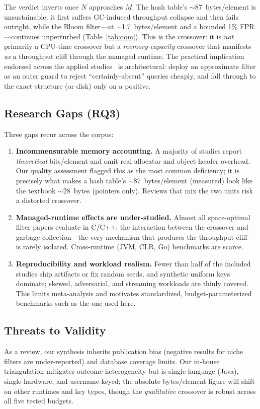 \documentclass[conference]{IEEEtran}
\begin{document}
The verdict inverts once $N$ approaches $M$. The hash table's
$\sim$87~bytes/element is unsustainable; it first suffers GC-induced throughput
collapse and then fails outright, while the Bloom filter---at
$\sim$1.7~bytes/element and a bounded 1\% FPR---continues unperturbed
(Table~\ref{tab:oom}). This is the crossover: it is \emph{not} primarily a
CPU-time crossover but a \emph{memory-capacity} crossover that manifests
\emph{as} a throughput cliff through the managed runtime. The practical
implication endorsed across the applied studies~\cite{chang2008bigtable,
tarkoma2012bloom} is architectural: deploy an approximate filter as an outer
guard to reject ``certainly-absent'' queries cheaply, and fall through to the
exact structure (or disk) only on a positive.

\subsection{Research Gaps (RQ3)}
Three gaps recur across the corpus:

\begin{enumerate}
  \item \textbf{Incommensurable memory accounting.} A majority of studies
        report \emph{theoretical} bits/element and omit real allocator and
        object-header overhead. Our quality assessment flagged this as the most
        common deficiency; it is precisely what makes a hash table's
        $\sim$87~bytes/element (measured) look like the textbook
        $\sim$28~bytes (pointers only). Reviews that mix the two units risk a
        distorted crossover.
  \item \textbf{Managed-runtime effects are under-studied.} Almost all
        space-optimal filter papers evaluate in C/C++; the interaction between
        the crossover and garbage collection---the very mechanism that produces
        the throughput cliff---is rarely isolated. Cross-runtime (JVM, CLR, Go)
        benchmarks are scarce.
  \item \textbf{Reproducibility and workload realism.} Fewer than half of the
        included studies ship artifacts or fix random seeds, and synthetic
        uniform keys dominate; skewed, adversarial, and streaming workloads are
        thinly covered. This limits meta-analysis and motivates standardized,
        budget-parameterized benchmarks such as the one used here.
\end{enumerate}

\subsection{Threats to Validity}
As a review, our synthesis inherits publication bias (negative results for
niche filters are under-reported) and database coverage limits. Our in-house
triangulation mitigates outcome heterogeneity but is single-language (Java),
single-hardware, and username-keyed; the absolute bytes/element figure will
shift on other runtimes and key types, though the \emph{qualitative} crossover
is robust across all five tested budgets.
\end{document}
